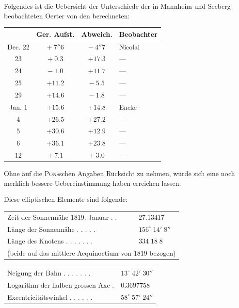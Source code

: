 \par\indent Folgendes ist die Uebersicht der Unterschiede der in Mannheim und Seeberg beobachteten
Oerter von den berechneten:

\begin{center}
\begin{tabular}{c|c|c|l}
& Ger. Aufst. & Abweich. & Beobachter \\
\hline
Dec. 22 & $+\ 7''6$  & $-\ 4''7$  & Nicolai \\
     23 & $+\ 0.3$   & $+17.3$    & --- \\
     24 & $-\ 1.0$   & $+11.7$    & --- \\
     25 & $+11.2$    & $-\ 5.5$   & --- \\
     29 & $+14.6$    & $-\ 1.8$   & --- \\
Jan.  1 & $+15.6$    & $+14.8$    & Encke \\
      4 & $+26.5$    & $+27.2$    & --- \\
      5 & $+30.6$    & $+12.9$    & --- \\
      6 & $+36.1$    & $+23.8$    & --- \\
     12 & $+\ 7.1$   & $+\ 3.0$   & --- \\
\end{tabular}
\end{center}

\par\indent Ohne auf die \textsc{Pons}schen Angaben Rücksicht zu nehmen, würde sich eine noch merklich
bessere Uebereinstimmung haben erreichen lassen.

\par\indent Diese elliptischen Elemente sind folgende:

\begin{center}
\begin{tabular}{ll}
Zeit der Sonnennähe 1819. Januar . . & $27.13417$\footnotemark \\
Länge der Sonnennähe . . . . . & $156^\circ\;14'\;8''$ \\
Länge des Knotens . . . . . . . & $334\;18\;8$ \\
\multicolumn{2}{l}{(beide auf das mittlere Aequinoctium von 1819 bezogen)} \\
\end{tabular}\par\smallskip
\begin{tabular}{ll}
Neigung der Bahn . . . . . . . & $13^\circ\;42'\;30''$ \\
Logarithm der halben grossen Axe . & $0.3697758$ \\
Excentricitätswinkel . . . . . . & $58^\circ\;57'\;24''$ \\
\end{tabular}
\end{center}

